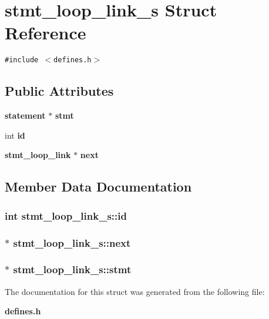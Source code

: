 \section{stmt\_\-loop\_\-link\_\-s Struct Reference}
\label{structstmt__loop__link__s}
{\tt \#include $<$defines.h$>$}

\subsection*{Public Attributes}
\begin{CompactItemize}
\item 
{\bf statement} $\ast$ {\bf stmt}
\item 
int {\bf id}
\item 
{\bf stmt\_\-loop\_\-link} $\ast$ {\bf next}
\end{CompactItemize}


\subsection{Member Data Documentation}
\subsubsection{\setlength{\rightskip}{0pt plus 5cm}int stmt\_\-loop\_\-link\_\-s::id}\label{structstmt__loop__link__s_m1}


\subsubsection{$\ast$ stmt\_\-loop\_\-link\_\-s::next}\label{structstmt__loop__link__s_m2}


\subsubsection{$\ast$ stmt\_\-loop\_\-link\_\-s::stmt}\label{structstmt__loop__link__s_m0}




The documentation for this struct was generated from the following file:\begin{CompactItemize}
\item 
{\bf defines.h}\end{CompactItemize}
